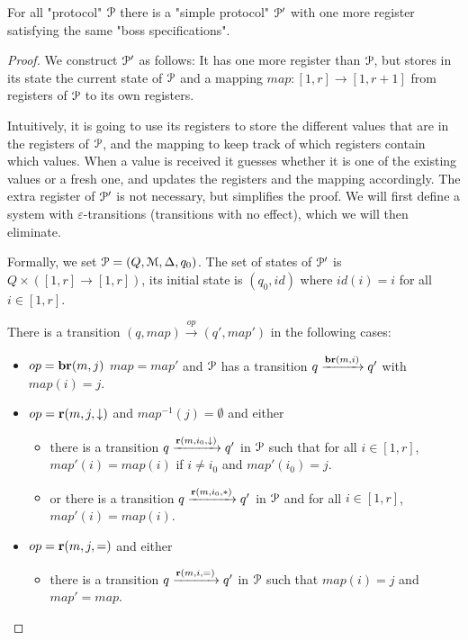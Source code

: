 \begin{lemma}
	\label{lem:simple-reduction}
	For all "protocol" $\mathcal{P}$ there is a "simple protocol" $\mathcal{P}'$ with one more register satisfying the same "boss specifications".
\end{lemma}
\ifproofs
\begin{proof}
	
	We construct $\mathcal{P}'$ as follows: It has one more register than $\mathcal{P}$, but stores in its state the current state of $\mathcal{P}$ and a mapping $map : [1,r] \to [1,r+1]$ from registers of $\mathcal{P}$ to its own registers.
	
	Intuitively, it is going to use its registers to store the different values that are in the registers of $\mathcal{P}$, and the mapping to keep track of which registers contain which values.
	When a value is received it guesses whether it is one of the existing values or a fresh one, and updates the registers and the mapping accordingly.
	The extra register of $\mathcal{P}'$ is not necessary, but simplifies the proof.
	We will first define a system with $\varepsilon$-transitions (transitions with no effect), which we will then eliminate. 
	
	
	Formally, we set $\mathcal{P} = (Q, \mathcal{M}, \Delta, q_0)$.
	The set of states of $\mathcal{P}'$ is $Q \times ([1,r] \to [1,r])$, its initial state is $(q_0, id)$ where $id(i) = i$ for all $i \in [1,r]$. 
	
	There is a transition $(q, map) \xrightarrow{op} (q', map')$ in the following cases:
	
	\begin{itemize}
		\item $op = \textbf{br}(m, j)$ 
		$map = map'$ and $\mathcal{P}$ has a transition $q \xrightarrow{\textbf{br}(m, i)} q'$ with $map(i)=j$.
		
		\item $op=\textbf{r}(m, j, \downarrow)$ and $map^{-1}(j) =\emptyset$ and either
		\begin{itemize}
			\item there is a transition $q \xrightarrow{\textbf{r}(m, i_0, \downarrow)} q'$ in $\mathcal{P}$ such that for all $i \in [1,r]$, $map'(i) = map(i)$ if $i \neq i_0$ and $map'(i_0) = j$.
			
			\item or there is a transition $q \xrightarrow{\textbf{r}(m, i_0, {*})} q'$ in $\mathcal{P}$ and for all $i \in [1,r]$, $map'(i) = map(i)$.
		\end{itemize}
		
		\item $op = \textbf{r}(m, j, {=})$ and either
		\begin{itemize}
			\item there is a transition $q \xrightarrow{\textbf{r}(m, i, {=})} q'$ in $\mathcal{P}$ such that $map(i)=j$ and $map'=map$.
			

\end{itemize}
\end{itemize}
\end{proof}
